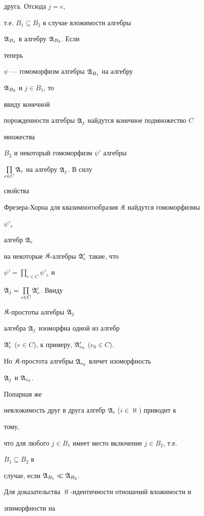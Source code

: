 \begin{pf}
друга. Отсюда $j=e$,


т.е. $B_1\subseteq B_2$ в случае вложимости алгебры


$\frak A_{B_1}$ в алгебру $\frak A_{B_2}$. Если


теперь


$\psi$ --- гомоморфизм алгебры $\frak A_{B_1}$ на алгебру


$\frak A_{B_2}$ и $j\in B_1$, то


ввиду конечной


порожденности алгебры $\frak A_j$ найдутся конечное подмножество $C$


множества


$B_2$ и некоторый гомоморфизм $\psi'$ алгебры


$\prod\limits_{e\in C}\frak A_e$ на алгебру $\frak A_j$. В силу


свойства


Фрезера-Хорна для квазимногообразия $\frak K$ найдутся гомоморфизмы


$\psi'_e$


алгебр $\frak A_e$


на некоторые $\frak K$-алгебры $\frak A'_e$ такие, что


$\psi'=\prod\limits_{e\in C}\psi'_e$ и


$\frak A_j=\prod\limits_{e\in C}\frak A'_e$. Ввиду


$\frak K$-простоты алгебры $\frak A_j$


алгебра $\frak A_j$ изоморфна одной из алгебр


$\frak A'_e$ ($e\in C$), к примеру, $\frak A'_{e_0}$ ($e_0\in C$).


Но $\frak K$-простота алгебры $\frak A_{e_0}$ влечет изоморфность


$\frak A_j$ и $\frak A_{e_0}$.


Попарная же


невложимость друг в друга алгебр $\frak A_i$ ($i\in\aleph$) приводит к


тому,


что для любого $j\in B_1$ имеет место включение $j\in B_2$, т.е.


$B_1\subseteq B_2$ в


случае, если $\frak A_{B_1}\ll\frak A_{B_2}$.





Для доказательства $\aleph$-идентичности отношений вложимости и


эпиморфности на



\end{pf}

